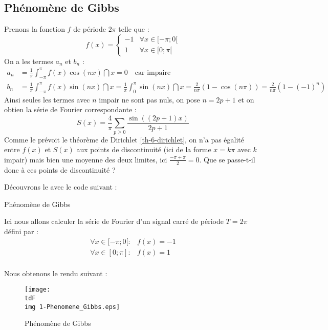 	\subsection{Phénomène de Gibbs}
		Prenons la fonction $f$ de période $2\pi$ telle que :
		\begin{equation}
			f(x) = \begin{cases}
				-1		&	\forall x \in [-\pi;0[	\\
				1		&	\forall x \in [0; \pi[
			\end{cases}
		\end{equation}
		On a les termes $a_n$ et $b_n$ :
		\begin{align}
			a_n &= \frac{1}{\pi} \int_{-\pi}^\pi f(x)\cos(n x) \dint{x} = 0 \quad\text{car impaire}		\\
			b_n &= \frac{1}{\pi} \int_{-\pi}^\pi f(x)\sin(n x) \dint{x}
				= \frac{1}{\pi} \int_0^\pi \sin(nx) \dint{x}
				= \frac{2}{n\pi} (1 - \cos(n\pi)) = \frac{2}{n\pi}(1-(-1)^n)
		\end{align}
		Ainsi seules les termes avec $n$ impair ne sont pas nuls, on pose $n=2p+1$ et on obtien la série de Fourier correspondante : 
		\begin{equation}
			S(x) = \frac{4}{\pi} \sum_{p\geq0} \frac{\sin((2p+1)x)}{2p+1}
		\end{equation}
		Comme le prévoit le théorème de Dirichlet \eqref{th-6-dirichlet}, on n'a pas égalité entre $f(x)$ et $S(x)$ aux points de discontinuité (ici de la forme $x=k\pi$ avec $k$ impair) mais bien une moyenne des deux limites, ici $\frac{-\pi + \pi}{2} = 0$.
		Que se passe-t-il donc à ces points de discontinuité ?

		Découvrons le avec le code suivant :
		\begin{listing}[H]
			\caption{Phénomène de Gibbs}
			\label{code-6-phenomeneGibbs}
		\end{listing}

		Ici nous allons calculer la série de Fourier d'un signal carré de période $T = 2\pi$ défini par :
		\begin{align*}
			\forall x \in [-\pi;0[ : &	f(x) = -1		\\
			\forall x \in [0;\pi] : &	f(x) = 1		\\
		\end{align*}

		Nous obtenons le rendu suivant :

		\begin{figure}[H]
			\centering
			\texttt{[image: \\tdF\\img 1-Phenomene\_Gibbs.eps]}
			\caption{Phénomène de Gibbs}
			\label{img-6-phenomeneGibbs}
		\end{figure}

